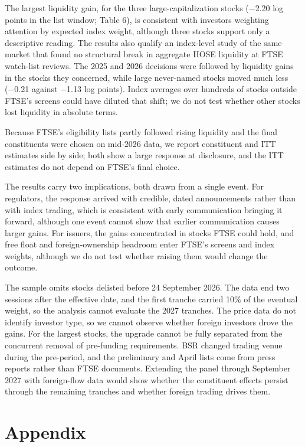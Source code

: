 The largest liquidity gain, for the three large-capitalization stocks
(−2.20 log points in the list window; Table 6), is consistent with
investors weighting attention by expected index weight, although three
stocks support only a descriptive reading. The results also qualify an
index-level study of the same market that found no structural break in
aggregate HOSE liquidity at FTSE watch-list reviews. The 2025 and 2026
decisions were followed by liquidity gains in the stocks they concerned,
while large never-named stocks moved much less (−0.21 against −1.13 log
points). Index averages over hundreds of stocks outside FTSE's screens
could have diluted that shift; we do not test whether other stocks lost
liquidity in absolute terms.

Because FTSE's eligibility lists partly followed rising liquidity and
the final constituents were chosen on mid-2026 data, we report
constituent and ITT estimates side by side; both show a large response
at disclosure, and the ITT estimates do not depend on FTSE's final
choice.

The results carry two implications, both drawn from a single event. For
regulators, the response arrived with credible, dated announcements
rather than with index trading, which is consistent with early
communication bringing it forward, although one event cannot show that
earlier communication causes larger gains. For issuers, the gains
concentrated in stocks FTSE could hold, and free float and
foreign-ownership headroom enter FTSE's screens and index weights,
although we do not test whether raising them would change the outcome.

The sample omits stocks delisted before 24 September 2026. The data end
two sessions after the effective date, and the first tranche carried
10\% of the eventual weight, so the analysis cannot evaluate the 2027
tranches. The price data do not identify investor type, so we cannot
observe whether foreign investors drove the gains. For the largest
stocks, the upgrade cannot be fully separated from the concurrent
removal of pre-funding requirements. BSR changed trading venue during
the pre-period, and the preliminary and April lists come from press
reports rather than FTSE documents. Extending the panel through
September 2027 with foreign-flow data would show whether the constituent
effects persist through the remaining tranches and whether foreign
trading drives them.

\hypertarget{appendix}{%
\section{Appendix}\label{appendix}}

